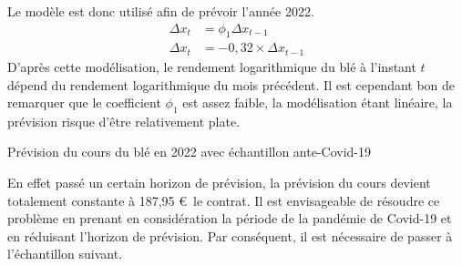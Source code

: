 Le modèle est donc utilisé afin de prévoir l'année 2022.
\begin{equation*}
\begin{split}
    \Delta x_{t} &= \phi_{1} \Delta x_{t-1} \\
    \Delta x_{t} &=-0,32 \times \Delta x_{t-1}
\end{split}
\end{equation*}
D'après cette modélisation, le rendement logarithmique du blé à l'instant $t$ dépend du rendement logarithmique du mois précédent. Il est cependant bon de remarquer 
que le coefficient $\phi_{1}$ est assez faible, la modélisation étant linéaire, la prévision risque d'être relativement plate.
\begin{table}[H]
    \centering
    \caption{Prévision du cours du blé en 2022 avec échantillon ante-Covid-19}
    \sffamily
    
\end{table}
En effet passé un certain horizon de prévision, la prévision du cours devient totalement constante à 187,95 \euro\ le contrat. Il est envisageable de résoudre ce 
problème en prenant en considération la période de la pandémie de Covid-19 et en réduisant l'horizon de prévision. Par conséquent, il est nécessaire de passer à 
l'échantillon suivant.
